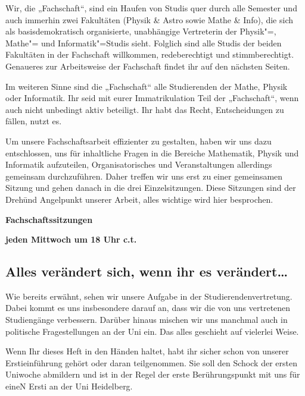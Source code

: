 Wir, die „Fachschaft“, sind ein Haufen von Studis quer durch alle Semester und auch immerhin zwei Fakultäten (Physik \& Astro sowie Mathe \& Info), die sich als basisdemokratisch organisierte, unabhängige Vertreterin der Physik"=, Mathe"= und Informatik"=Studis sieht. Folglich sind alle Studis der beiden Fakultäten in der Fachschaft willkommen, redeberechtigt und stimmberechtigt. Genaueres zur Arbeitsweise der Fachschaft findet ihr auf den nächsten Seiten.

Im weiteren Sinne sind die „Fachschaft“ alle Studierenden der Mathe, Physik oder Informatik. Ihr seid mit eurer Immatrikulation Teil der „Fachschaft“, wenn auch nicht unbedingt aktiv beteiligt. Ihr habt das Recht, Entscheidungen zu fällen, nutzt es.

Um unsere Fachschaftsarbeit effizienter zu gestalten, haben wir uns dazu entschlossen, uns für inhaltliche Fragen in die Bereiche Mathematik, Physik und Informatik aufzuteilen, Organisatorisches und Veranstaltungen allerdings gemeinsam durchzuführen. Daher treffen wir uns erst zu einer gemeinsamen Sitzung und gehen danach in die drei Einzelsitzungen. Diese Sitzungen sind der Dreh\= und Angelpunkt unserer Arbeit, alles wichtige wird hier besprochen.

\begin{center}
\large
\textbf{Fachschaftssitzungen}

\textbf{jeden Mittwoch um 18 Uhr \gls{c.t.}}
\end{center}


\subsection*{Alles verändert sich, wenn ihr es verändert\dots}
Wie bereits erwähnt, sehen wir unsere Aufgabe in der Studierendenvertretung. Dabei kommt es uns insbesondere darauf an, dass wir die von uns vertretenen Studiengänge verbessern. Darüber hinaus mischen wir uns manchmal auch in politische Fragestellungen an der Uni ein. Das alles geschieht auf vielerlei Weise.

Wenn Ihr dieses Heft in den Händen haltet, habt ihr sicher schon von unserer Erstieinführung gehört oder daran teilgenommen. Sie soll den Schock der ersten Uniwoche abmildern und ist in der Regel der erste Berührungspunkt mit uns für eineN Ersti an der Uni Heidelberg.

